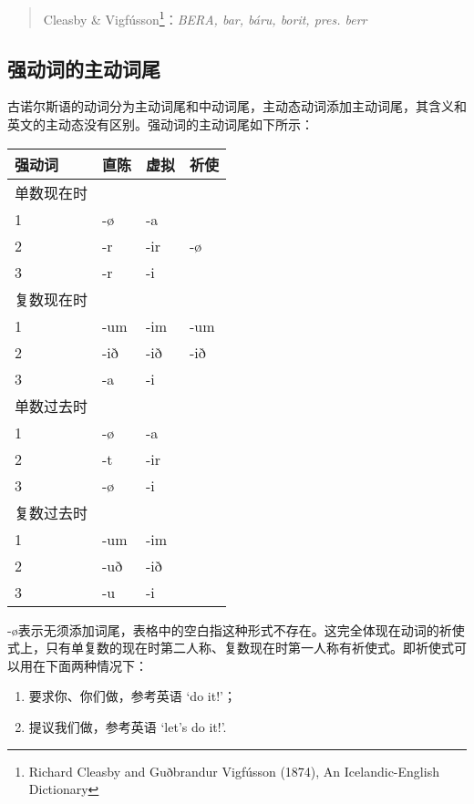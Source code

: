 \begin{quote}
  Cleasby \& Vigfússon\footnote{Richard Cleasby and Guðbrandur Vigfússon
    (1874), An Icelandic-English Dictionary}：\emph{BERA, bar, báru,
    borit, pres. berr}
\end{quote}

\subsection{强动词的主动词尾}\label{强动词的主动词尾}

古诺尔斯语的动词分为主动词尾和中动词尾，主动态动词添加主动词尾，其含义和英文的主动态没有区别。强动词的主动词尾如下所示：

\begin{longtable}{llll}
  \toprule
  强动词     & 直陈 & 虚拟 & 祈使 \\
  \midrule
  \endhead
  \bottomrule
  \endfoot
  单数现在时 &      &      &      \\
  1          & -ø   & -a   &      \\
  2          & -r   & -ir  & -ø   \\
  3          & -r   & -i   &      \\
  复数现在时 &      &      &      \\
  1          & -um  & -im  & -um  \\
  2          & -ið  & -ið  & -ið  \\
  3          & -a   & -i   &      \\
  单数过去时 &      &      &      \\
  1          & -ø   & -a   &      \\
  2          & -t   & -ir  &      \\
  3          & -ø   & -i   &      \\
  复数过去时 &      &      &      \\
  1          & -um  & -im  &      \\
  2          & -uð  & -ið  &      \\
  3          & -u   & -i   &      \\
\end{longtable}

-ø表示无须添加词尾，表格中的空白指这种形式不存在。这完全体现在动词的祈使式上，只有单复数的现在时第二人称、复数现在时第一人称有祈使式。即祈使式可以用在下面两种情况下：

\begin{enumerate}
  \def\labelenumi{\arabic{enumi})}
  \item
        要求你、你们做，参考英语 `do it!'；
  \item
        提议我们做，参考英语 `let's do it!'.
\end{enumerate}


